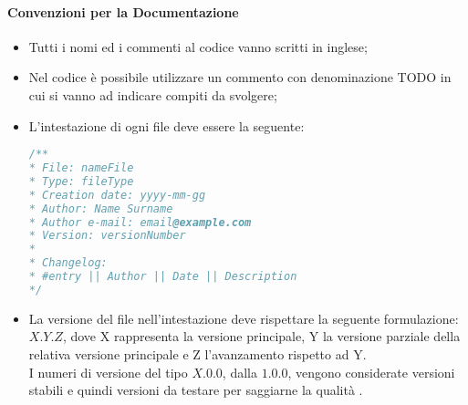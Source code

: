 \paragraph{Convenzioni per la Documentazione}
\begin{itemize}	
	\item Tutti i nomi ed i commenti al codice vanno scritti in inglese;
	\item Nel codice è possibile utilizzare un commento con denominazione TODO in cui si vanno ad indicare compiti da svolgere;
	\item L'intestazione di ogni file deve essere la seguente:
	\begin{lstlisting}[language=JavaScript]
/**
* File: nameFile
* Type: fileType
* Creation date: yyyy-mm-gg
* Author: Name Surname
* Author e-mail: email@example.com
* Version: versionNumber 
*
* Changelog:
* #entry || Author || Date || Description
*/
	\end{lstlisting}
	\item La versione del file nell'intestazione deve rispettare la seguente formulazione: $X.Y.Z$, dove X rappresenta la versione principale, Y la versione parziale della relativa versione principale e Z l'avanzamento rispetto ad Y.\\ I numeri di versione del tipo $X.0.0$, dalla $1.0.0$, vengono considerate versioni stabili e quindi versioni da testare per saggiarne la qualità .
\end{itemize}

